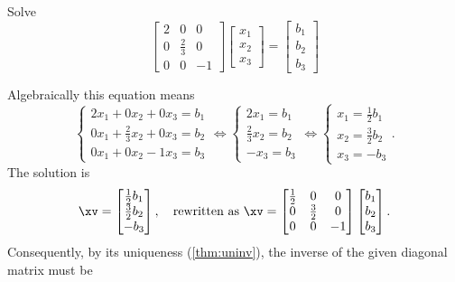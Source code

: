 \begin{example} \label{eg:a3x3inv}
Solve \begin{equation*}
\begin{bmatrix} 2&0&0\\0&\frac23&0\\0&0&-1 \end{bmatrix}
\begin{bmatrix} x_1\\x_2\\x_3 \end{bmatrix}
=\begin{bmatrix} b_1\\b_2\\b_3 \end{bmatrix}
\end{equation*}
\begin{solution}
Algebraically this equation means
\begin{equation*}
\begin{cases} 2x_1+0x_2+0x_3=b_1
\\0x_1+\frac23x_2+0x_3=b_2
\\0x_1+0x_2-1x_3=b_3\end{cases}
\iff
\begin{cases} 2x_1=b_1
\\\frac23x_2=b_2
\\-x_3=b_3\end{cases}
\iff
\begin{cases} x_1=\frac12b_1 \\ x_2=\frac32b_2 \\ x_3=-b_3\end{cases}.
\end{equation*}
The solution is 
\begin{equation*}
\xv=\begin{bmatrix} \frac12b_1 \\ \frac32b_2 \\ -b_3 \end{bmatrix},
\quad\text{rewritten as }
\xv=\begin{bmatrix} \frac12&0&0\\0&\frac32&0\\0&0&-1 \end{bmatrix}
\begin{bmatrix} b_1\\b_2\\b_3 \end{bmatrix}.
\end{equation*}
Consequently, by its uniqueness (\autoref{thm:uninv}), the inverse of the given diagonal matrix must be

\end{solution}
\end{example}
